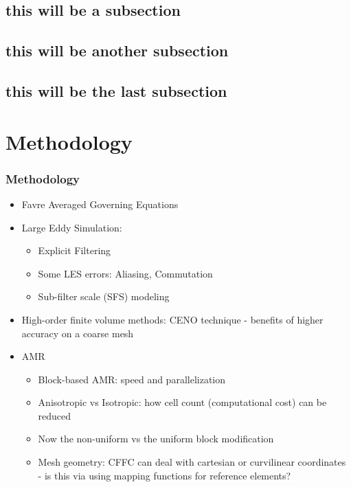 \documentclass{beamer}
\begin{document}
\subsection{this will be a subsection}

\subsection{this will be another subsection}

\subsection{this will be the last subsection}


\section[Methodology]{Methodology}
\begin{frame}%
\frametitle{Methodology}
\scriptsize
\begin{itemize}
\item Favre Averaged Governing Equations
\item Large Eddy Simulation:
  \begin{itemize}
  \scriptsize
   \item Explicit Filtering
   \item Some LES errors: Aliasing, Commutation
   \item Sub-filter scale (SFS) modeling
  \end{itemize}
\item High-order finite volume methods: CENO technique - benefits of higher accuracy on a coarse mesh
\item AMR
   \begin{itemize}
   \scriptsize
   \item Block-based AMR: speed and parallelization
   \item Anisotropic vs Isotropic: how cell count (computational cost) can be reduced
   \item Now the non-uniform vs the uniform block modification
   \item Mesh geometry: CFFC can deal with cartesian or curvilinear coordinates - is this via using mapping functions for reference elements?
   \end{itemize}
\end{itemize}
\end{frame}
\end{document}
